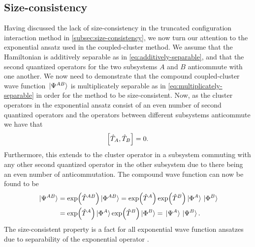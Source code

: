         \subsection{Size-consistency}
            Having discussed the lack of size-consistency in the truncated
            configuration interaction method in
            \autoref{subsec:size-consistency}, we now turn our attention to the
            exponential ansatz used in the coupled-cluster method.
            We assume that the Hamiltonian is additively separable as in
            \autoref{eq:additively-separable}, and that the second quantized
            operators for the two subsystems $A$ and $B$ anticommute with one
            another.
            We now need to demonstrate that the compound coupled-cluster wave
            function $\ket*{\Psi^{AB}}$ is multiplicately separable as in
            \autoref{eq:multiplicately-separable} in order for the method to be
            size-consistent.
            Now, as the cluster operators in the exponential ansatz consist of
            an even number of second quantized operators and the operators
            between different subsystems anticommute we have that
            \begin{align}
                \left[\hat{T}_{A}, \hat{T}_{B}\right] = 0.
            \end{align}
            Furthermore, this extends to the cluster operator in a subsystem
            commuting with any other second quantized operator in the other
            subsystem due to there being an even number of anticommutation.
            The compound wave function can now be found to be
            \begin{align}
                \ket*{\Psi^{AB}}
                &= \exp(\hat{T}^{AB})\ket*{\Phi^{AB}}
                =
                \exp(\hat{T}^{A})\exp(\hat{T}^{B})
                \ket*{\Phi^{A}}\ket*{\Phi^{B}}
                \\
                &=
                \exp(\hat{T}^{A})\ket*{\Phi^{A}}
                \exp(\hat{T}^{B})\ket*{\Phi^{B}}
                = \ket*{\Psi^{A}}\ket*{\Psi^{B}}.
            \end{align}
            The size-consistent property is a fact for all exponential wave
            function ansatzes due to separability of the exponential operator
            \cite{helgaker-molecular, size-extensivity}.

